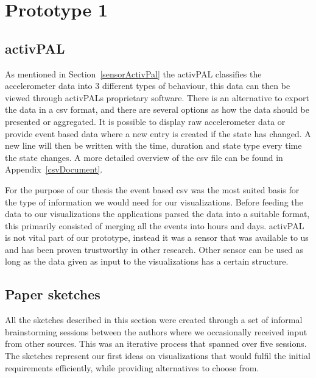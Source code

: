 \chapter{Prototype 1}

\section{activPAL}
As mentioned in Section~\ref{sensorActivPal} the activPAL classifies the accelerometer data into 3 different types of behaviour, this data can then be viewed through activPALs proprietary software. There is an alternative to export the data in a \gls{csv} format, and there are several options as how the data should be presented or aggregated. It is possible to display raw accelerometer data or provide event based data where a new entry is created if the state has changed. A new line will then be written with the time, duration and state type every time the state changes. A more detailed overview of the \gls{csv} file can be found in Appendix~\ref{csvDocument}.

For the purpose of our thesis the event based \gls{csv} was the most suited basis for the type of information we would need for our visualizations. Before feeding the data to our visualizations the applications parsed the data into a suitable format, this primarily consisted of merging all the events into hours and days. activPAL is not vital part of our prototype, instead it was a sensor that was available to us and has been proven trustworthy in other research. Other sensor can be used as long as the data given as input to the visualizations has a certain structure.



\section{Paper sketches}
All the sketches described in this section were created through a set of informal brainstorming sessions between the authors where we occasionally received input from other sources. This was an iterative process that spanned over five sessions. The sketches represent our first ideas on visualizations that would fulfil the initial requirements efficiently, while providing alternatives to choose from. 

